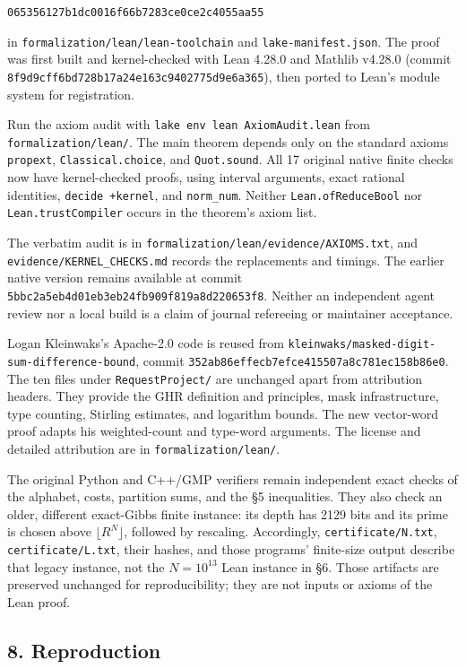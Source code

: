 \documentclass[
  10pt,
]{article}
\begin{document}
\texttt{065356127b1dc0016f66b7283ce0ce2c4055aa55}

in \texttt{formalization/lean/lean-toolchain} and
\texttt{lake-manifest.json}. The proof was first built and
kernel-checked with Lean 4.28.0 and Mathlib v4.28.0 (commit
\texttt{8f9d9cff6bd728b17a24e163c9402775d9e6a365}), then ported to
Lean's module system for registration.

Run the axiom audit with \texttt{lake\ env\ lean\ AxiomAudit.lean} from
\texttt{formalization/lean/}. The main theorem depends only on the
standard axioms \texttt{propext}, \texttt{Classical.choice}, and
\texttt{Quot.sound}. All 17 original native finite checks now have
kernel-checked proofs, using interval arguments, exact rational
identities, \texttt{decide\ +kernel}, and \texttt{norm\_num}. Neither
\texttt{Lean.ofReduceBool} nor \texttt{Lean.trustCompiler} occurs in the
theorem's axiom list.

The verbatim audit is in
\texttt{formalization/lean/evidence/AXIOMS.txt}, and
\texttt{evidence/KERNEL\_CHECKS.md} records the replacements and
timings. The earlier native version remains available at commit
\texttt{5bbc2a5eb4d01eb3eb24fb909f819a8d220653f8}. Neither an
independent agent review nor a local build is a claim of journal
refereeing or maintainer acceptance.

Logan Kleinwaks's Apache-2.0 code is reused from
\texttt{kleinwaks/masked-digit-sum-difference-bound}, commit
\texttt{352ab86effecb7efce415507a8c781ec158b86e0}. The ten files under
\texttt{RequestProject/} are unchanged apart from attribution headers.
They provide the GHR definition and principles, mask infrastructure,
type counting, Stirling estimates, and logarithm bounds. The new
vector-word proof adapts his weighted-count and type-word arguments. The
license and detailed attribution are in \texttt{formalization/lean/}.

The original Python and C++/GMP verifiers remain independent exact
checks of the alphabet, costs, partition sums, and the §5 inequalities.
They also check an older, different exact-Gibbs finite instance: its
depth has 2129 bits and its prime is chosen above
\(\lfloor R^N\rfloor\), followed by rescaling. Accordingly,
\texttt{certificate/N.txt}, \texttt{certificate/L.txt}, their hashes,
and those programs' finite-size output describe that legacy instance,
not the \(N=10^{13}\) Lean instance in §6. Those artifacts are preserved
unchanged for reproducibility; they are not inputs or axioms of the Lean
proof.

\subsection{8. Reproduction}\label{reproduction}
\end{document}
